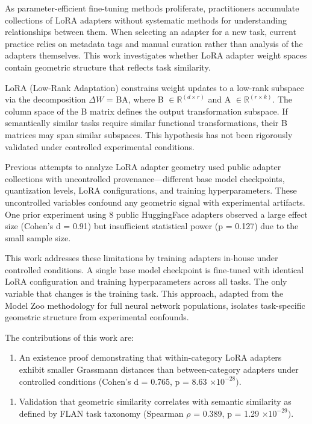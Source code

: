 
As parameter-efficient fine-tuning methods proliferate, practitioners accumulate collections of LoRA adapters without systematic methods for understanding relationships between them. When selecting an adapter for a new task, current practice relies on metadata tags and manual curation rather than analysis of the adapters themselves. This work investigates whether LoRA adapter weight spaces contain geometric structure that reflects task similarity.

LoRA (Low-Rank Adaptation) constrains weight updates to a low-rank subspace via the decomposition $\Delta W$ = BA, where B $\in \mathbb{R}^(d\times r)$ and A $\in \mathbb{R}^(r\times k)$. The column space of the B matrix defines the output transformation subspace. If semantically similar tasks require similar functional transformations, their B matrices may span similar subspaces. This hypothesis has not been rigorously validated under controlled experimental conditions.

Previous attempts to analyze LoRA adapter geometry used public adapter collections with uncontrolled provenance---different base model checkpoints, quantization levels, LoRA configurations, and training hyperparameters. These uncontrolled variables confound any geometric signal with experimental artifacts. One prior experiment using 8 public HuggingFace adapters observed a large effect size (Cohen's d = 0.91) but insufficient statistical power (p = 0.127) due to the small sample size.

This work addresses these limitations by training adapters in-house under controlled conditions. A single base model checkpoint is fine-tuned with identical LoRA configuration and training hyperparameters across all tasks. The only variable that changes is the training task. This approach, adapted from the Model Zoo methodology for full neural network populations, isolates task-specific geometric structure from experimental confounds.

The contributions of this work are:

\begin{enumerate}
\item An existence proof demonstrating that within-category LoRA adapters exhibit smaller Grassmann distances than between-category adapters under controlled conditions (Cohen's d = 0.765, p = 8.63 $\times 10^{-28})$.
\end{enumerate}

\begin{enumerate}
\item Validation that geometric similarity correlates with semantic similarity as defined by FLAN task taxonomy (Spearman $\rho$ = 0.389, p = 1.29 $\times 10^{-29})$.
\end{enumerate}

